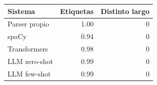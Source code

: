 \begin{tabular}{lrr}
\toprule
Sistema & Etiquetas & Distinto largo \\
\midrule
Parser propio & 1.00 & 0 \\
spaCy & 0.94 & 0 \\
Transformers & 0.98 & 0 \\
LLM zero-shot & 0.99 & 0 \\
LLM few-shot & 0.99 & 0 \\
\bottomrule
\end{tabular}
